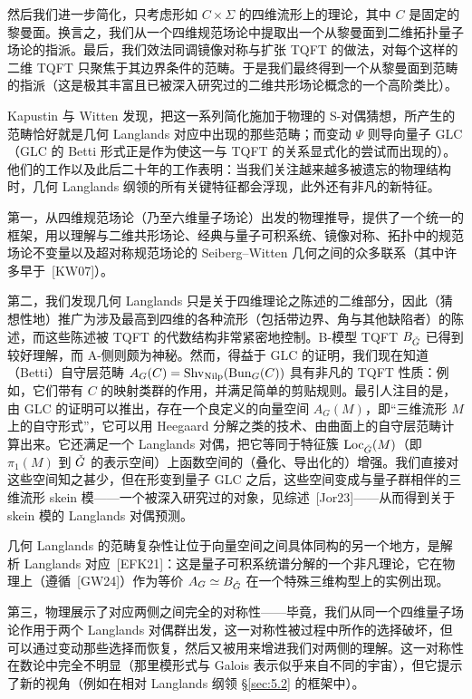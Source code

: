 然后我们进一步简化，只考虑形如 $C\times\Sigma$ 的四维流形上的理论，其中 $C$ 是固定的黎曼面。换言之，我们从一个四维规范场论中提取出一个从黎曼面到二维拓扑量子场论的指派。最后，我们效法同调镜像对称与扩张 TQFT 的做法，对每个这样的二维 TQFT 只聚焦于其边界条件的范畴。于是我们最终得到一个从黎曼面到范畴的指派（这是极其丰富且已被深入研究过的二维共形场论概念的一个高阶类比）。

Kapustin 与 Witten 发现，把这一系列简化施加于物理的 S-对偶猜想，所产生的范畴恰好就是几何 Langlands 对应中出现的那些范畴；而变动 $\Psi$ 则导向量子 GLC（GLC 的 Betti 形式正是作为使这一与 TQFT 的关系显式化的尝试而出现的）。他们的工作以及此后二十年的工作表明：当我们关注越来越多被遗忘的物理结构时，几何 Langlands 纲领的所有关键特征都会浮现，此外还有非凡的新特征。

第一，从四维规范场论（乃至六维量子场论）出发的物理推导，提供了一个统一的框架，用以理解与二维共形场论、经典与量子可积系统、镜像对称、拓扑中的规范场论不变量以及超对称规范场论的 Seiberg–Witten 几何之间的众多联系（其中许多早于~[KW07]）。

第二，我们发现几何 Langlands 只是关于四维理论之陈述的二维部分，因此（猜想性地）推广为涉及最高到四维的各种流形（包括带边界、角与其他缺陷者）的陈述，而这些陈述被 TQFT 的代数结构非常紧密地控制。B-模型 TQFT $B_{\check{G}}$ 已得到较好理解，而 A-侧则颇为神秘。然而，得益于 GLC 的证明，我们现在知道（Betti）自守层范畴 $A_{G}(C)=\operatorname{Shv}_{\operatorname{Nilp}}(\operatorname{Bun}_{G}(C))$ 具有非凡的 TQFT 性质：例如，它们带有 $C$ 的映射类群的作用，并满足简单的剪贴规则。最引人注目的是，由 GLC 的证明可以推出，存在一个良定义的向量空间 $A_{G}(M)$，即“三维流形 $M$ 上的自守形式”，它可以用 Heegaard 分解之类的技术、由曲面上的自守层范畴计算出来。它还满足一个 Langlands 对偶，把它等同于特征簇 $\operatorname{Loc}_{\check{G}}(M)$（即 $\pi_{1}(M)$ 到 $\check{G}$ 的表示空间）上函数空间的（叠化、导出化的）增强。我们直接对这些空间知之甚少，但在形变到量子 GLC 之后，这些空间变成与量子群相伴的三维流形 skein 模——一个被深入研究过的对象，见综述~[Jor23]——从而得到关于 skein 模的 Langlands 对偶预测。

几何 Langlands 的范畴复杂性让位于向量空间之间具体同构的另一个地方，是解析 Langlands 对应~[EFK21]：这是量子可积系统谱分解的一个非凡理论，它在物理上（遵循~[GW24]）作为等价 $A_{G}\simeq B_{\check{G}}$ 在一个特殊三维构型上的实例出现。

第三，物理展示了对应两侧之间完全的对称性——毕竟，我们从同一个四维量子场论作用于两个 Langlands 对偶群出发，这一对称性被过程中所作的选择破坏，但可以通过变动那些选择而恢复，然后又被用来增进我们对两侧的理解。这一对称性在数论中完全不明显（那里模形式与 Galois 表示似乎来自不同的宇宙），但它提示了新的视角（例如在相对 Langlands 纲领 \S\ref{sec:5.2} 的框架中）。

